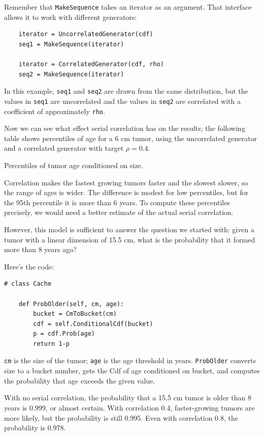 \documentclass[12pt]{book}
\begin{document}
Remember that {\tt MakeSequence} takes an iterator as an argument.
That interface allows it to work with different generators:

\begin{verbatim}
    iterator = UncorrelatedGenerator(cdf)
    seq1 = MakeSequence(iterator)

    iterator = CorrelatedGenerator(cdf, rho)
    seq2 = MakeSequence(iterator)
\end{verbatim}

In this example, {\tt seq1} and {\tt seq2} are
drawn from the same distribution, but the values in {\tt seq1}
are uncorrelated and the values in {\tt seq2} are correlated
with a coefficient of approximately {\tt rho}.

Now we can see what effect serial correlation has on the results;
the following table shows percentiles of age for a 6 cm tumor,
using the uncorrelated generator and a correlated generator
with target $\rho = 0.4$.

\begin{table}

\caption{Percentiles of tumor age conditioned on size.}
\end{table}

Correlation makes the fastest growing tumors faster and the slowest
slower, so the range of ages is wider.  The difference is modest for
low percentiles, but for the 95th percentile it is more than 6 years.
To compute these percentiles precisely, we would need a better
estimate of the actual serial correlation.

However, this model is sufficient to answer the question
we started with: given a tumor with a linear dimension of
15.5 cm, what is the probability that it formed more than
8 years ago?

Here's the code:

\begin{verbatim}
# class Cache

    def ProbOlder(self, cm, age):
        bucket = CmToBucket(cm)
        cdf = self.ConditionalCdf(bucket)
        p = cdf.Prob(age)
        return 1-p
\end{verbatim}

{\tt cm} is the size of the tumor; {\tt age} is the age threshold
in years.  {\tt ProbOlder} converts size to a bucket number,
gets the Cdf of age conditioned on bucket, and computes the
probability that age exceeds the given value.

With no serial correlation, the probability that a
15.5 cm tumor is older than 8 years is 0.999, or almost certain.
With correlation 0.4, faster-growing tumors are more likely, but
the probability is still 0.995.  Even with correlation 0.8, the
probability is 0.978.
\end{document}
